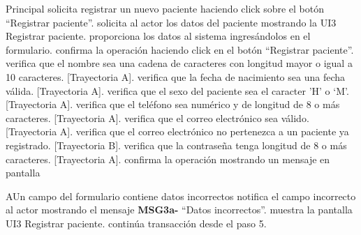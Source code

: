 \begin{UCtrayectoria}{Principal}
	\UCpaso[\UCactor] solicita registrar un nuevo paciente haciendo click sobre el botón ``Registrar paciente''.
	\UCpaso solicita al actor los datos del paciente mostrando la UI3 Registrar paciente.
	\UCpaso[\UCactor] proporciona los datos al sistema ingresándolos en el formulario.
	\UCpaso[\UCactor] confirma la operación haciendo click en el botón “Registrar paciente”.
	\UCpaso verifica que el nombre sea una cadena de caracteres con longitud mayor o igual a 10 caracteres. [Trayectoria A].
	\UCpaso verifica que la fecha de nacimiento sea una fecha válida. [Trayectoria A].
	\UCpaso verifica que  el sexo del paciente sea el caracter 'H' o ‘M’. [Trayectoria A].
	\UCpaso verifica que el teléfono sea numérico y de longitud de 8 o más caracteres. [Trayectoria A].
	\UCpaso verifica que el correo electrónico sea válido. [Trayectoria A].
	\UCpaso verifica que el correo electrónico no pertenezca a un paciente ya registrado. [Trayectoria B].
	\UCpaso verifica que la contraseña tenga longitud de 8 o más caracteres. [Trayectoria A].
	\UCpaso confirma la operación mostrando un mensaje en pantalla
\end{UCtrayectoria}

\begin{UCtrayectoriaA}{A}{Un campo del formulario contiene datos incorrectos}
	\UCpaso notifica el campo incorrecto al actor mostrando el mensaje {\bf MSG3a-} ``Datos incorrectos''.
	\UCpaso muestra la pantalla UI3 Registrar paciente.
	\UCpaso continúa transacción desde el paso 5.
\end{UCtrayectoriaA}
		
